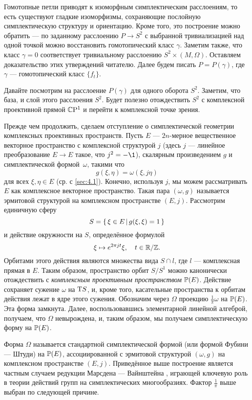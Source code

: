 Гомотопные петли приводят к изоморфным симплектическим расслоениям, то
есть существуют гладкие изоморфизмы, сохраняющие послойную
симплектическую структуру и ориентацию.
Кроме того, это построение можно обратить — по заданному расслоению
$P \to S^2$ с выбранной тривиализацией над одной точкой можно
восстановить гомотопический класс $\gamma$.
Заметим также, что класс $\gamma = 0$ соответствует тривиальному
расслоению $S^2 \times (M, \Omega)$.
Оставляем доказательство этих утверждений читателю.
Далее будем писать $P = P(\gamma)$, где $\gamma$ — гомотопический класс
$\{f_t\}$.

Давайте посмотрим на расслоение $P(\gamma)$ для одного оборота $S^2$.
Заметим, что база, и слой этого расслоения $S^2$.
Будет полезно отождествить $S^2$ с комплексной проективной прямой $\mathbb{C}\mathrm{P}^1$ и перейти к комплексной точке зрения.

Прежде чем продолжить, сделаем отступление о симплектической геометрии
комплексных проективных пространств. 
Пусть $E$ — $2n$-мерное вещественное векторное пространство с
комплексной структурой $j$ 
(здесь $j$ — линейное преобразование $E\to E$ такое, что $j^2 = -\1$),
скалярным произведением $g$ и симплектической формой~$\omega$, такими что
\[g(\xi, \eta ) = \omega(\xi, j\eta)\]
для всех $\xi, \eta \in E$ (ср. с \ref{sec:4.1}).
Конечно, используя $j$, мы можем рассматривать $E$ как комплексное
векторное пространство. 
Такая пара $(\omega, g)$ называется эрмитовой структурой на
комплексном пространстве $(E, j)$.
Рассмотрим единичную сферу
\[S = \left\{ \,{\xi \in E}\, \middle| \,{g(\xi, \xi) = 1}\, \right\}\]
и действие окружности на $S$, определённое формулой 
\[\xi \mapsto e^{2\pi jt} \xi,\quad t \in \mathbb{R}/\mathbb{Z}.\]
Орбитами этого действия являются множества вида $S \cap l$, где $l$ — комплексная прямая в $E$. 
Таким образом, пространство орбит $S/S^1$ можно канонически отождествить с \emph{комплексным проективным пространством} $\mathbb{P}(E)$.
Действие сохраняет сужение $\omega$ на $\mathrm{T} S$, и, кроме того, касательные пространства к орбитам действия лежат в ядре этого сужения.
Обозначим через $\Omega$ проекцию $\tfrac1\pi \omega$ на $\mathbb{P}(E)$.
Эта форма замкнута.
Далее, воспользовавшись элементарной линейной алгеброй, получаем, что $\Omega$ невырождена, и, таким образом, мы получаем симплектическую форму на $\mathbb{P}(E)$. 

Форма $\Omega$ называется стандартной симплектической формой (или формой Фубини — Штуди) на $\mathbb{P}(E)$, ассоциированной с эрмитовой структурой $(\omega, g)$ на комплексном пространстве $(E, j)$.
Приведённое выше построение является частным случаем редукции Марсдена — Вайнштейна \cite{MS}, играющей ключевую роль в теории действий
групп на симплектических многообразиях.
Фактор $\tfrac1\pi$ выше выбран по следующей причине.

